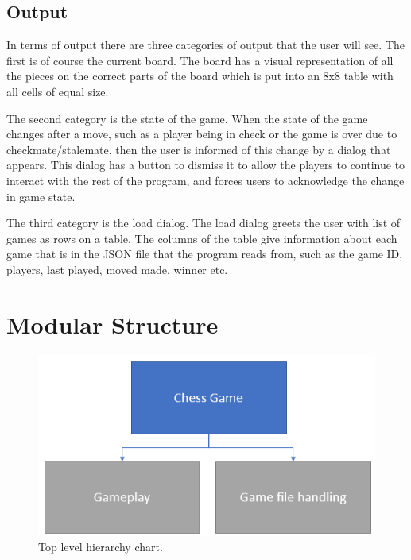 \documentclass[twoside, 12pt]{report}
\begin{document}
\subsection{Output}
In terms of output there are three categories of output that the user will see. The first is of course the current board. The board has a visual representation of all the pieces on the correct parts of the board which is put into an 8x8 table with all cells of equal size. 

The second category is the state of the game. When the state of the game changes after a move, such as a player being in check or the game is over due to checkmate/stalemate, then the user is informed of this change by a dialog that appears. This dialog has a button to dismiss it to allow the players to continue to interact with the rest of the program, and forces users to acknowledge the change in game state.

The third category is the load dialog. The load dialog greets the user with list of games as rows on a table. The columns of the table give information about each game that is in the JSON file that the program reads from, such as the game ID, players, last played, moved made, winner etc. 
\section{Modular Structure}
\begin{figure}[H]
\centering
	\includegraphics[width=1.0\textwidth]{images/design-charts/top_level}
	\caption{Top level hierarchy chart.}
\end{figure}
\end{document}
